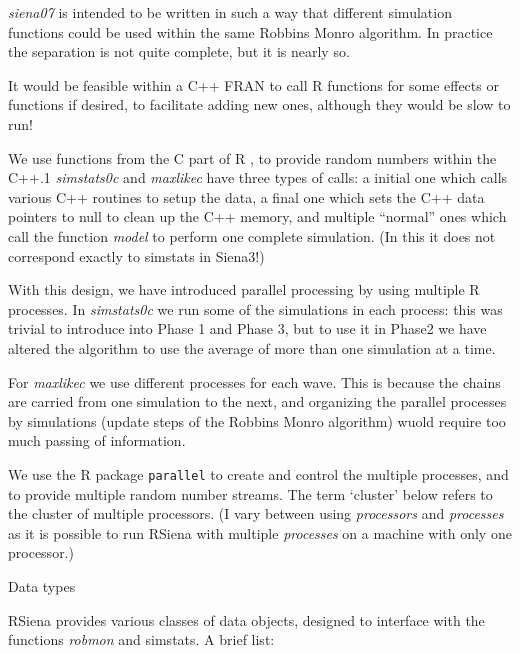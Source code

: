 \documentclass[12pt,a4paper]{article}
\makeatletter
\renewcommand{\=}{\,=\,}
\newcommand{\+}{\,+\,}
\newcommand{\nm}[1]{\textsf{ #1}}
\newcommand{\nnm}[1]{\textsf{\textit{#1}}}
\renewcommand{\section}{\@startsection{section}{1}
                {0pt}{\baselineskip}{0.5\baselineskip}
                {\centering\sffamily} }
\newcommand{\R}{{\sf R }}
\newcommand{\RS}{{\sf RSiena }}
\makeatother
\begin{document}
\nnm{siena07} is intended to be written in such a way that different simulation
functions could be used within the same Robbins Monro algorithm. In practice the
separation is not quite complete, but it is nearly so.

It would be feasible within a C++ \nm{FRAN} to call \R functions for some
effects or functions if desired, to facilitate adding new ones, although they
would be slow to run!

We use functions from the C part of \R, to provide random numbers within the
C++.1 \nnm{simstats0c} and \nnm{maxlikec} have three types of calls: a initial
one which calls various C++ routines to setup the data, a final one which sets
the C++ data pointers to null to clean up the C++ memory, and multiple
``normal'' ones which call the function \nnm{model} to perform one complete
simulation. (In this it does not correspond exactly to \nm{simstats} in Siena3!)

With this design, we have introduced parallel processing by using multiple \R
processes. In \nnm{simstats0c} we run some of the simulations in each process:
this was trivial to introduce into Phase 1 and Phase 3, but to use it in Phase2
we have altered the algorithm to use the average of more than one simulation at
a time.

For \nnm{maxlikec} we use different processes for each wave.
This is because the chains are carried from one simulation to the next,
and organizing the parallel processes by simulations (update steps of the Robbins
Monro algorithm) wuold require too much passing of information.

We use the
\R package \verb|parallel| to create and control the multiple processes, and
to provide multiple random number streams.  The term
`cluster' below refers to the cluster of multiple processors. (I vary between
using \emph{processors} and \emph{processes} as it is possible to run \RS with
multiple \emph{processes} on a machine with only one processor.)


\section{Data types}

\RS provides various classes of data objects, designed to interface with the
functions \nnm{robmon} and \nm{simstats}. A brief list:
\end{document}

